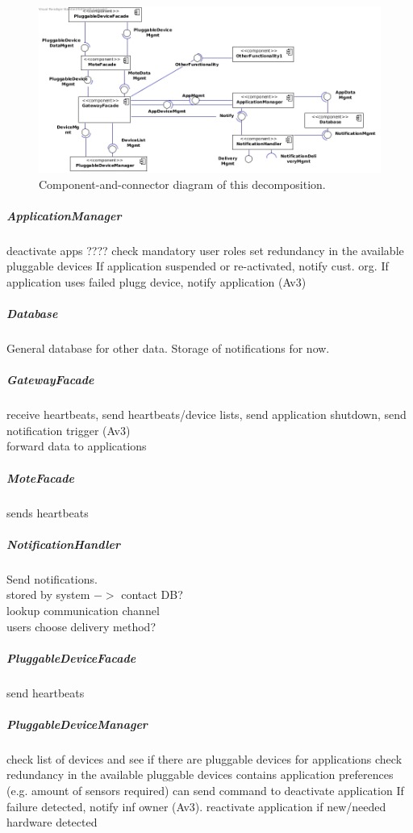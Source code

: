         \begin{figure}[!htp]
        	\centering
        	\includegraphics[width=1.00\textwidth]{component-diagram-1}
        	\caption{Component-and-connector diagram of this decomposition.}
            \label{fig:it1-cc_main}
        \end{figure}

    \subparagraph{ApplicationManager}
        deactivate apps
        ???? check mandatory user roles
        set redundancy in the available pluggable devices
        If application suspended or re-activated, notify cust. org.
        If application uses failed plugg device, notify application
        (Av3)

    \subparagraph{Database}
        General database for other data. Storage of notifications for now.

    \subparagraph{GatewayFacade}
        receive heartbeats, send heartbeats/device lists, send application shutdown, send notification trigger (Av3)\\
        forward data to applications

    \subparagraph{MoteFacade}
        sends heartbeats

    \subparagraph{NotificationHandler}
        Send notifications. \\
        stored by system \(->\) contact DB? \\
        lookup communication channel \\
        users choose delivery method?

    \subparagraph{PluggableDeviceFacade}
        send heartbeats

    \subparagraph{PluggableDeviceManager}
        check list of devices and see if there are pluggable devices for applications
        check redundancy in the available pluggable devices
        contains application preferences (e.g. amount of sensors required)
        can send command to deactivate application
        If failure detected, notify inf owner (Av3).
        reactivate application if new/needed hardware detected

